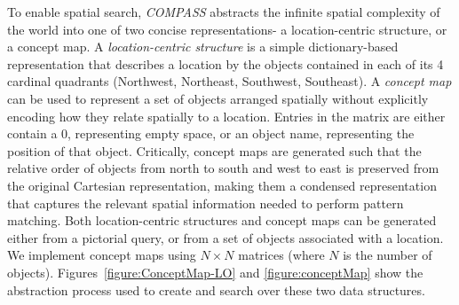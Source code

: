 


\par{
To enable spatial search, \emph{COMPASS} abstracts the infinite spatial complexity of the world into one of two concise representations- a location-centric structure, or a concept map.
A \textit{location-centric structure} is a simple dictionary-based representation that describes a location by the objects contained in each of its 4 cardinal quadrants (Northwest, Northeast, Southwest, Southeast).
A \textit{concept map} can be used to represent a set of objects arranged spatially without explicitly encoding how they relate spatially to a location. 
Entries in the matrix are either contain a $0$, representing empty space, or an object name, representing the position of that object.
Critically, concept maps are generated such that the relative order of objects from north to south and west to east is preserved from the original Cartesian representation, making them a condensed representation that captures the relevant spatial information needed to perform pattern matching.
Both location-centric structures and concept maps can be generated either from a pictorial query, or from a set of objects associated with a location. 
We implement concept maps using $N \times N$ matrices (where $N$ is the number of objects).
Figures~\ref{figure:ConceptMap-LO} and \ref{figure:conceptMap} show the abstraction process used to create and search over these two data structures.
}

